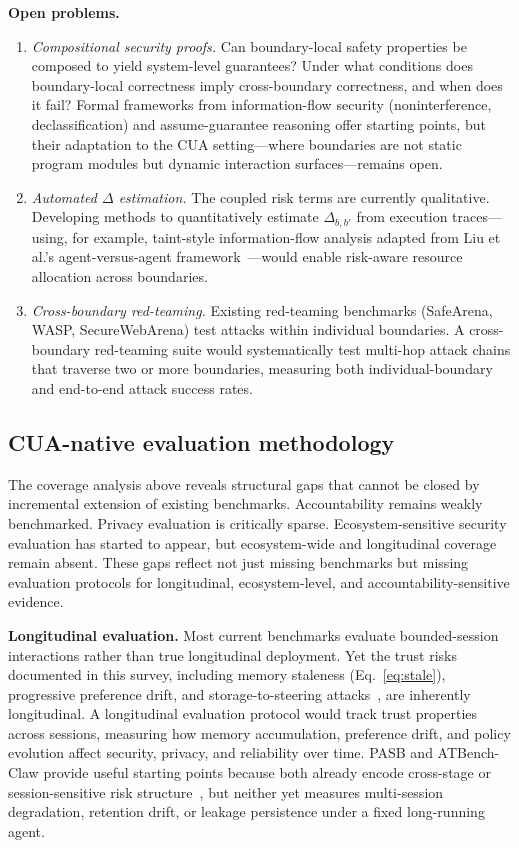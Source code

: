 \smallskip
\noindent\textbf{Open problems.}
\begin{enumerate}[leftmargin=1.5em,itemsep=2pt]
\item \emph{Compositional security proofs.} Can boundary-local safety properties be composed to yield system-level guarantees? Under what conditions does boundary-local correctness imply cross-boundary correctness, and when does it fail? Formal frameworks from information-flow security (noninterference, declassification) and assume-guarantee reasoning offer starting points, but their adaptation to the CUA setting---where boundaries are not static program modules but dynamic interaction surfaces---remains open.
\item \emph{Automated $\Delta$ estimation.} The coupled risk terms are currently qualitative. Developing methods to quantitatively estimate $\Delta_{b,b'}$ from execution traces---using, for example, taint-style information-flow analysis adapted from Liu et al.'s agent-versus-agent framework~\cite{makeagentdefeatagent2025}---would enable risk-aware resource allocation across boundaries.
\item \emph{Cross-boundary red-teaming.} Existing red-teaming benchmarks (SafeArena, WASP, SecureWebArena) test attacks within individual boundaries. A cross-boundary red-teaming suite would systematically test multi-hop attack chains that traverse two or more boundaries, measuring both individual-boundary and end-to-end attack success rates.
\end{enumerate}

\subsection{CUA-native evaluation methodology}
\label{sec:future-evaluation}

The coverage analysis above reveals structural gaps that cannot be closed by incremental extension of existing benchmarks. Accountability remains weakly benchmarked. Privacy evaluation is critically sparse. Ecosystem-sensitive security evaluation has started to appear, but ecosystem-wide and longitudinal coverage remain absent. These gaps reflect not just missing benchmarks but missing evaluation protocols for longitudinal, ecosystem-level, and accountability-sensitive evidence.

\smallskip
\noindent\textbf{Longitudinal evaluation.}
Most current benchmarks evaluate bounded-session interactions rather than true longitudinal deployment. Yet the trust risks documented in this survey, including memory staleness (Eq.~\ref{eq:stale}), progressive preference drift, and storage-to-steering attacks~\cite{storagetosteering2026}, are inherently longitudinal. A longitudinal evaluation protocol would track trust properties across sessions, measuring how memory accumulation, preference drift, and policy evolution affect security, privacy, and reliability over time. PASB and ATBench-Claw provide useful starting points because both already encode cross-stage or session-sensitive risk structure~\cite{doubleagent2026,atbenchclaw2026}, but neither yet measures multi-session degradation, retention drift, or leakage persistence under a fixed long-running agent.


